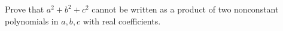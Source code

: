 Prove that $a^2+b^2+c^2$ cannot be written as a product of two nonconstant polynomials in $a,b,c$ with real coefficients.
